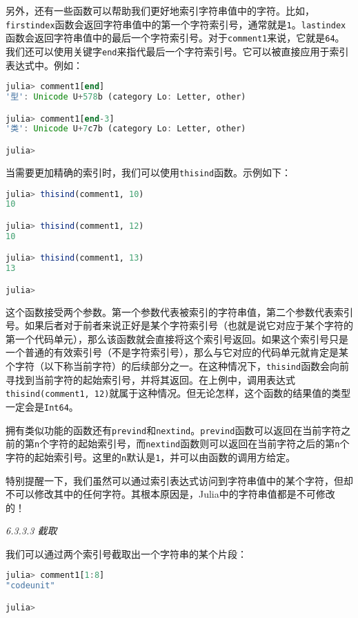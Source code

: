 另外，还有一些函数可以帮助我们更好地索引字符串值中的字符。比如，\verb|firstindex|函数会返回字符串值中的第一个字符索引号，通常就是\verb|1|。\verb|lastindex|函数会返回字符串值中的最后一个字符索引号。对于\verb|comment1|来说，它就是\verb|64|。我们还可以使用关键字\verb|end|来指代最后一个字符索引号。它可以被直接应用于索引表达式中。例如：
\begin{lstlisting}[language=julia]
julia> comment1[end]
'型': Unicode U+578b (category Lo: Letter, other)

julia> comment1[end-3]
'类': Unicode U+7c7b (category Lo: Letter, other)

julia> 
\end{lstlisting}

当需要更加精确的索引时，我们可以使用\verb|thisind|函数。示例如下：
\begin{lstlisting}[language=julia]
julia> thisind(comment1, 10)
10

julia> thisind(comment1, 12)
10

julia> thisind(comment1, 13)
13

julia> 
\end{lstlisting}

这个函数接受两个参数。第一个参数代表被索引的字符串值，第二个参数代表索引号。如果后者对于前者来说正好是某个字符索引号（也就是说它对应于某个字符的第一个代码单元），那么该函数就会直接将这个索引号返回。如果这个索引号只是一个普通的有效索引号（不是字符索引号），那么与它对应的代码单元就肯定是某个字符（以下称当前字符）的后续部分之一。在这种情况下，\verb|thisind|函数会向前寻找到当前字符的起始索引号，并将其返回。在上例中，调用表达式\verb|thisind(comment1, 12)|就属于这种情况。但无论怎样，这个函数的结果值的类型一定会是\verb|Int64|。

拥有类似功能的函数还有\verb|prevind|和\verb|nextind|。\verb|prevind|函数可以返回在当前字符之前的第\verb|n|个字符的起始索引号，而\verb|nextind|函数则可以返回在当前字符之后的第\verb|n|个字符的起始索引号。这里的\verb|n|默认是\verb|1|，并可以由函数的调用方给定。

特别提醒一下，我们虽然可以通过索引表达式访问到字符串值中的某个字符，但却不可以修改其中的任何字符。其根本原因是，Julia中的字符串值都是不可修改的！

\textsl{6.3.3.3 截取}

我们可以通过两个索引号截取出一个字符串的某个片段：
\begin{lstlisting}[language=julia]
julia> comment1[1:8]
"codeunit"

julia> 
\end{lstlisting}


